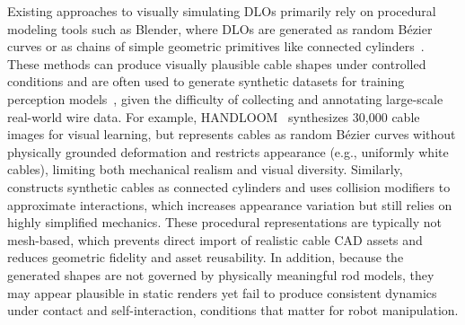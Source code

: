 \documentclass[letterpaper, 10 pt, conference]{ieeeconf}  %
\begin{document}
Existing approaches to visually simulating DLOs primarily rely on procedural modeling tools such as Blender, where DLOs are generated as random B\'ezier curves or as chains of simple geometric primitives like connected cylinders~\cite{handloom, wiredata}. These methods can produce visually plausible cable shapes under controlled conditions and are often used to generate synthetic datasets for training perception models~\cite{handloom,FASTDLO,wiredata,Zanella2021AutogeneratedWD,ISCUTE}, given the difficulty of collecting and annotating large-scale real-world wire data. For example, HANDLOOM~\cite{handloom} synthesizes 30{,}000 cable images for visual learning, but represents cables as random B\'ezier curves without physically grounded deformation and restricts appearance (e.g., uniformly white cables), limiting both mechanical realism and visual diversity. Similarly, \cite{wiredata} constructs synthetic cables as connected cylinders and uses collision modifiers to approximate interactions, which increases appearance variation but still relies on highly simplified mechanics. These procedural representations are typically not mesh-based, which prevents direct import of realistic cable CAD assets and reduces geometric fidelity and asset reusability. In addition, because the generated shapes are not governed by physically meaningful rod models, they may appear plausible in static renders yet fail to produce consistent dynamics under contact and self-interaction, conditions that matter for robot manipulation.

\end{document}
